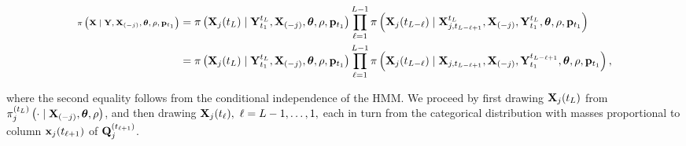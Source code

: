 \begin{scriptsize}
	\begin{align*}\scriptsize
	\pi\left (\mathbf{X} \mid \mathbf{Y}, \mathbf{X}_{(-j)},\boldsymbol{\theta}, \rho,\mathbf{p}_{t_1}\right ) &= \pi\left (\mathbf{X}_j(t_L) \mid \mathbf{Y}_{t_1}^{t_L}, \mathbf{X}_{(-j)},\boldsymbol{\theta},\rho, \mathbf{p}_{t_1}\right ) \prod_{\ell = 1}^{L-1}\pi \left (\mathbf{X}_j(t_{L-\ell}) \mid \mathbf{X}_{j,t_{L-\ell+1}}^{t_L}, \mathbf{X}_{(-j)}, \mathbf{Y}_{t_1}^{t_L}, \boldsymbol{\theta}, \rho, \mathbf{p}_{t_1}\right )\\
	&= \pi\left (\mathbf{X}_j(t_L) \mid \mathbf{Y}_{t_1}^{t_L}, \mathbf{X}_{(-j)},\boldsymbol{\theta},\rho, \mathbf{p}_{t_1}\right ) \prod_{\ell = 1}^{L-1}\pi \left (\mathbf{X}_j(t_{L-\ell}) \mid \mathbf{X}_{j,t_{L-\ell+1}}, \mathbf{X}_{(-j)}, \mathbf{Y}_{t_1}^{t_{L-\ell+1}}, \boldsymbol{\theta}, \rho, \mathbf{p}_{t_1}\right ),
	\end{align*}
\end{scriptsize} 
\hspace{-0.05in}where the second equality follows from the conditional independence of the HMM. We proceed by first drawing $ \mathbf{X}_j(t_L) $ from $ \pi_j^{(t_L)}\left (\cdot \mid \mathbf{X}_{(-j)}, \boldsymbol{\theta},\rho\right  ) $, and then drawing $ \mathbf{X}_j(t_\ell),\ \ell = L-1,\dots,1, $ each in turn from the categorical distribution with masses proportional to column $ \mathbf{x}_j(t_{\ell+1}) $ of $ \mathbf{Q}_j^{(t_{\ell+1})} $. 

